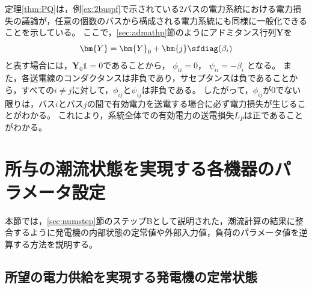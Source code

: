 \documentclass[tombow,dvipdfmx]{corona-a5-1.1}
\begin{document}
定理\ref{thm:PQ}は，例\ref{ex:2buspf}で示されている2バスの電力系統における電力損失の議論が，任意の個数のバスから構成される電力系統にも同様に一般化できることを示している。
ここで，\ref{sec:admathp}節のようにアドミタンス行列$\bm{Y}$を
\[
\bm{Y}=\bm{Y}_0 + \bm{j} \sfdiag(\beta_i)
\]
と表す場合には，$\bm{Y}_0 \mathds{1}=0$であることから，
$\phi_{ii}=0$，
$\psi_{ii}= - \beta_i$
となる。
また，各送電線のコンダクタンスは非負であり，サセプタンスは負であることから，すべての$i\neq j$に対して，$\phi_{ij} $と$\psi_{ij}$は非負である。
したがって，$\phi_{ij}$が0でない限りは，バス$i$とバス$j$の間で有効電力を送電する場合に必ず電力損失が生じることがわかる。
これにより，系統全体での有効電力の送電損失$L_P$は正であることがわかる。


\section{所与の潮流状態を実現する各機器のパラメータ設定}\label{sec:paradef}

本節では，\ref{sec:numstep}節のステップBとして説明された，潮流計算の結果に整合するように発電機の内部状態の定常値や外部入力値，負荷のパラメータ値を逆算する方法を説明する。


\subsection{所望の電力供給を実現する発電機の定常状態}\label{sec:stagen}
\end{document}
